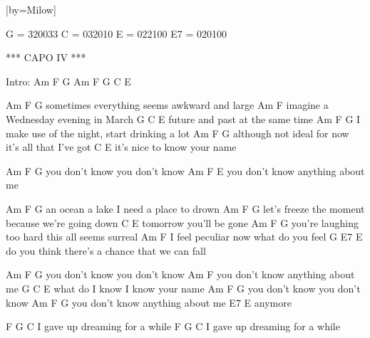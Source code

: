  

[by=Milow]







\beginverse
G = 320033
C = 032010
E = 022100
E7 = 020100

*** CAPO IV ***

Intro:  Am F G Am F G C E


Am         F                            G
sometimes everything seems awkward and large
Am                              F
imagine a Wednesday evening in March
           G           C    E
future and past at the same time
Am                F                            G
I make use of the night, start drinking a lot
             Am                                F   G
although not ideal for now it's all that I've got
              C         E
it's nice to know your name

Am             F                G
you don't know you don't know
               Am             F   E
you don't know anything about me


Am         F                      G
an ocean a lake I need a place to drown
                 Am                         F     G
let's freeze the moment because we're going down
         C          E
tomorrow you'll be gone
Am                  F                   G
you're laughing too hard this all seems surreal
       Am                       F
I feel peculiar now what do you feel
                       G                  E7     E
do you think there's a chance that we can fall

Am             F               G
you don't know you don't know
               Am              F
you don't know anything about me
        G                  C      E
what do I know I know your name
Am             F               G
you don't know you don't know
Am                            F   G
you don't know anything about me
E7      E
anymore

F          G              C
I gave up dreaming for a while
F          G              C
I gave up dreaming for a while


